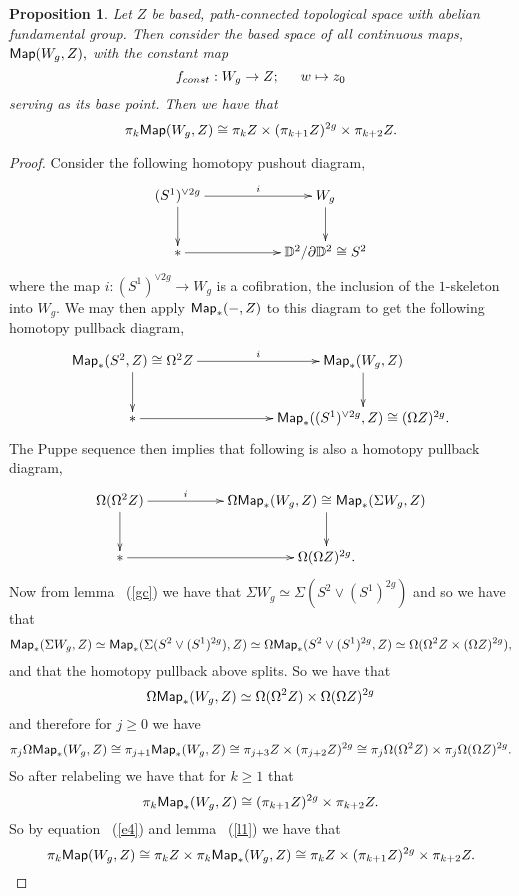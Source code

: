 \documentclass{amsart}
\newtheorem{prop}[theorem]{Proposition}
\theoremstyle{definition}
\theoremstyle{remark}
\begin{document}
\begin{prop}
Let $Z$ be based, path-connected topological space with abelian fundamental group. Then consider the based space of all continuous maps, ${\sf Map}(W_{g}, Z),$ with the constant map 
$$f_{const}: W_{g} \rightarrow Z; \hspace{15 pt } w \mapsto z_{0}$$ serving as its base point. Then we have that
$$\pi_{k}{\sf Map}(W_{g}, Z) \cong \pi_{k}Z \times (\pi_{k + 1}Z)^{2g} \times \pi_{k + 2}Z.$$
\end{prop}
\begin{proof}
Consider the following homotopy pushout diagram, 
$$
\xymatrix{
(S^{1})^{\vee 2g} \ar[rr]^-{i} \ar[d]^-{}
&&
W_{g} \ar[d]^-{}
\\
\ast \ar[rr]^-{} 
&&
\DD^{2}/\partial \DD^{2} \cong S^{2}
}$$
where the map $i: (S^{1})^{\vee 2g} \rightarrow W_{g}$ is a cofibration, the inclusion of the $1$-skeleton into $W_{g}$. We may then apply ${\sf Map}_{\ast}(-, Z)$ to this diagram to get the following homotopy pullback diagram,
$$
\xymatrix{
{\sf Map}_{\ast}(S^{2}, Z) \cong \Omega^{2}Z \ar[rr]^-{i} \ar[d]^-{}
&&
{\sf Map}_{\ast}(W_{g}, Z) \ar[d]^-{}
\\
\ast \ar[rr]^-{} 
&&
{\sf Map}_{\ast}((S^{1})^{\vee 2g}, Z) \cong (\Omega Z)^{2g}.
}$$
The Puppe sequence then implies that following is also a homotopy pullback diagram,
$$
\xymatrix{
\Omega( \Omega^{2}Z) \ar[rr]^-{i} \ar[d]^-{}
&&
\Omega {\sf Map}_{\ast}(W_{g}, Z) \cong {\sf Map}_{\ast}(\Sigma W_{g}, Z) \ar[d]^-{}
\\
\ast \ar[rr]^-{} 
&&
\Omega (\Omega Z)^{2g}.
}$$
Now from lemma ~(\ref{gc}) we have that $\Sigma W_{g} \simeq \Sigma(S^{2} \vee (S^{1})^{2g})$ and so we have that $${\sf Map}_{\ast}(\Sigma W_{g}, Z) \simeq {\sf Map}_{\ast}(\Sigma(S^{2} \vee (S^{1})^{2g}), Z) \simeq \Omega {\sf Map}_{\ast}(S^{2} \vee (S^{1})^{2g}, Z) \simeq \Omega(\Omega^{2}Z \times (\Omega Z)^{2g}),$$
and that the homotopy pullback above splits. So we have that $$\Omega {\sf Map}_{\ast}(W_{g}, Z) \simeq \Omega( \Omega^{2}Z) \times \Omega (\Omega Z)^{2g}$$ and therefore for $j \geq 0$ we have $$\pi_{j} \Omega {\sf Map}_{\ast}(W_{g}, Z)  \cong \pi_{j + 1}{\sf Map}_{\ast}(W_{g}, Z) \cong \pi_{j+ 3}Z \times (\pi_{j + 2}Z)^{2g} \cong \pi_{j}\Omega( \Omega^{2}Z) \times \pi_{j}\Omega (\Omega Z)^{2g}.$$ So after relabeling we have that for $k \geq 1$ that 
\begin{equation} \label{e4}
 \pi_{k}{\sf Map}_{\ast}(W_{g}, Z) \cong  (\pi_{k + 1}Z)^{2g} \times \pi_{k + 2}Z.
\end{equation} 
So by equation ~(\ref{e4}) and lemma ~(\ref{l1}) we have that $$\pi_{k}{\sf Map}(W_{g}, Z) \cong \pi_{k}Z  \times  \pi_{k}{\sf Map}_{\ast}(W_{g}, Z) \cong \pi_{k}Z  \times (\pi_{k + 1}Z)^{2g} \times \pi_{k + 2}Z.$$
\end{proof}
\end{document}
